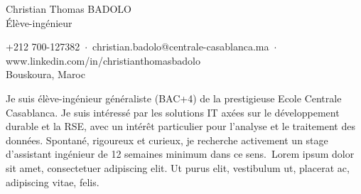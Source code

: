 \documentclass[a4paper,11pt]{article}
\newcommand{\mylipsum}{Lorem ipsum dolor sit amet, consectetuer adipiscing elit. Ut purus elit,
vestibulum ut, placerat ac, adipiscing vitae, felis.}
\begin{document}
\begin{minipage}{\textwidth}
    \vspace{7ex}
        \par{
        \centering
        \vspace{-0.9in}
            \textcolor{linkcolour}{\Large Christian Thomas BADOLO}\\
            \textcolor{linkcolour}{\Large Élève-ingénieur}
        \par}
\end{minipage}

\begin{center}
    +212 700-127382 \,$\cdot$\, christian.badolo@centrale-casablanca.ma \,$\cdot$\, www.linkedin.com/in/christianthomasbadolo \\
    Bouskoura, Maroc
\end{center}

Je suis élève-ingénieur généraliste (BAC+4) de la prestigieuse Ecole Centrale Casablanca. Je suis intéressé par les solutions IT axées sur le développement durable et la RSE, avec un intérêt particulier pour l'analyse et le traitement des données. Spontané, rigoureux et curieux, je recherche activement un stage d'assistant ingénieur de 12 semaines minimum dans ce sens.~\mylipsum

\end{document}
